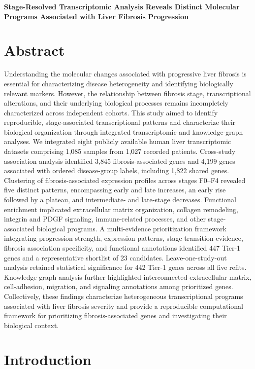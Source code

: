 \documentclass[11pt,a4paper]{article}
\begin{document}
{\centering\Large\bfseries Stage-Resolved Transcriptomic Analysis Reveals Distinct Molecular Programs Associated with Liver Fibrosis Progression\par}



\section*{Abstract}
Understanding the molecular changes associated with progressive liver fibrosis is essential for characterizing disease heterogeneity and identifying biologically relevant markers. However, the relationship between fibrosis stage, transcriptional alterations, and their underlying biological processes remains incompletely characterized across independent cohorts. This study aimed to identify reproducible, stage-associated transcriptional patterns and characterize their biological organization through integrated transcriptomic and knowledge-graph analyses. We integrated eight publicly available human liver transcriptomic datasets comprising 1,085 samples from 1,027 recorded patients. Cross-study association analysis identified 3,845 fibrosis-associated genes and 4,199 genes associated with ordered disease-group labels, including 1,822 shared genes. Clustering of fibrosis-associated expression profiles across stages F0–F4 revealed five distinct patterns, encompassing early and late increases, an early rise followed by a plateau, and intermediate- and late-stage decreases. Functional enrichment implicated extracellular matrix organization, collagen remodeling, integrin and PDGF signaling, immune-related processes, and other stage-associated biological programs. A multi-evidence prioritization framework integrating progression strength, expression patterns, stage-transition evidence, fibrosis association specificity, and functional annotations identified 447 Tier-1 genes and a representative shortlist of 23 candidates. Leave-one-study-out analysis retained statistical significance for 442 Tier-1 genes across all five refits. Knowledge-graph analysis further highlighted interconnected extracellular matrix, cell-adhesion, migration, and signaling annotations among prioritized genes. Collectively, these findings characterize heterogeneous transcriptional programs associated with liver fibrosis severity and provide a reproducible computational framework for prioritizing fibrosis-associated genes and investigating their biological context.
\section*{Introduction}
\end{document}
